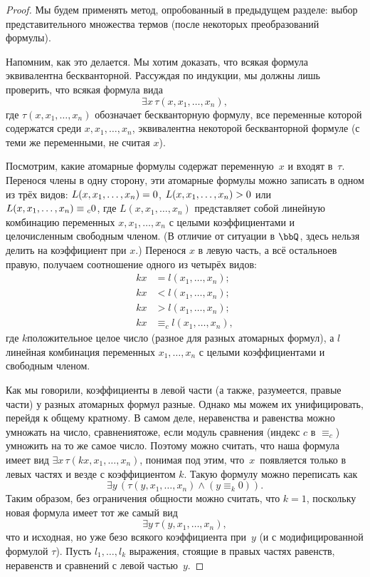 \begin{proof}
Мы будем применять метод, опробованный в предыдущем разделе:
выбор представительного множества термов (после некоторых
преобразований формулы).

Напомним, как это делается. Мы хотим доказать, что
всякая формула эквивалентна бескванторной. Рассуждая по
индукции, мы должны лишь проверить, что всякая формула вида
        $$
\exists x\, \tau(x,x_1,\dots,x_n),
        $$
где $\tau(x,x_1,\dots,x_n)$ обозначает бескванторную формулу,
все переменные которой содержатся среди $x,x_1,\dots,x_n$,
эквивалентна некоторой бескванторной формуле (с теми же
переменными, не считая $x$).

Посмотрим, какие атомарные формулы содержат переменную~$x$ и
входят в~$\tau$. Перенося члены в одну сторону, эти
атомарные формулы можно записать в одном из трёх видов:
$L(x,x_1,\dots,x_n)\hm=0$, $L(x,x_1,\dots,x_n)\hm>0$ или
$L(x,x_1,\dots,x_n)\hm\equiv_c 0$, где $L(x,x_1,\dots,x_n)$
представляет собой линейную комбинацию переменных
$x,x_1,\dots,x_n$ с целыми коэффициентами и целочисленным
свободным членом. (В отличие от ситуации в $\bbQ$, здесь нельзя
делить на коэффициент при $x$.) Перенося $x$ в левую часть, а
всё остальное\т в правую, получаем соотношение одного из четырёх
видов:
        \begin{align*}
kx & = l(x_1,\dots,x_n);\\
kx & < l(x_1,\dots,x_n);\\
kx & > l(x_1,\dots,x_n);\\
kx & \equiv_c  l(x_1,\dots,x_n),
        \end{align*}
где $k$\т положительное целое число (разное для
разных атомарных формул), а $l$\т линейная комбинация переменных
$x_1,\dots,x_n$ с целыми коэффициентами и свободным членом.

Как мы говорили, коэффициенты в левой части (а также,
разумеется, правые части) у разных атомарных формул разные.
Однако мы можем их унифицировать, перейдя к общему кратному. В
самом деле, неравенства и равенства можно умножать на число,
сравнения\т тоже, если модуль сравнения (индекс $c$ в $\equiv_c$)
умножить на то же самое число. Поэтому можно считать, что
наша формула имеет вид $\exists x\,\tau(kx,x_1,\dots,x_n)$,
понимая под этим, что~$x$~появляется только в левых частях и
везде с коэффициентом $k$. Такую формулу можно переписать как
        $$
\exists y\, (\tau(y,x_1,\dots,x_n) \land (y\equiv_k 0)).
        $$
Таким образом, без ограничения общности можно считать,
что $k=1$, поскольку новая формула имеет тот же самый
вид
        $$
\exists y\, \tau(y,x_1,\dots,x_n),
        $$
что и исходная, но уже безо всякого коэффициента при~$y$ (и с
модифицированной формулой $\tau$). Пусть $l_1,\dots,l_k$\т
выражения, стоящие в правых частях равенств, неравенств и
сравнений с левой частью~$y$.


\end{proof}
